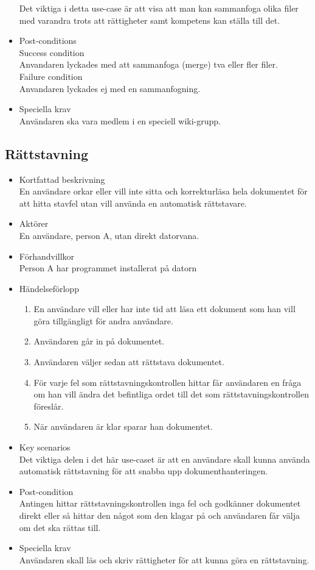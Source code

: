 \begin{itemize}
	Det viktiga i detta use-case är att visa att man kan sammanfoga olika filer med varandra trots att rättigheter samt kompetens kan ställa till det.
	\item Post-conditions	
		\\Success condition 
		\\Anvandaren lyckades med att sammanfoga (merge) tva eller fler filer.
		\\Failure condition
		\\Anvandaren lyckades ej med en sammanfogning.
		
	\item Speciella krav
	\\Användaren ska vara medlem i en speciell wiki-grupp.
\end{itemize}

\subsection{Rättstavning}
\begin{itemize}
	\item Kortfattad beskrivning
	\\En användare orkar eller vill inte sitta och korrekturläsa hela dokumentet för att hitta stavfel utan vill använda en automatisk rättstavare.
	\item Aktörer
	\\En användare, person A, utan direkt datorvana.
	\item Förhandvillkor
	\\Person A har programmet installerat på datorn
	\item Händelseförlopp
	\begin{enumerate}
		\item En användare vill eller har inte tid att läsa ett dokument som han vill göra tillgängligt för andra användare.
		\item Användaren går in på dokumentet.
		\item Användaren väljer sedan att rättstava dokumentet.
		\item För varje fel som rättstavningskontrollen hittar får användaren en fråga om han vill ändra det befintliga ordet till det som rättstavningskontrollen föreslår.
		\item När användaren är klar sparar han dokumentet.
	\end{enumerate}
	\item Key scenarios
	\\Det viktiga delen i det här use-caset är att en användare skall kunna använda automatisk rättstavning för att snabba upp dokumenthanteringen.
	\item Post-condition
	\\ Antingen hittar rättstavningskontrollen inga fel och godkänner dokumentet direkt eller så hittar den något som den klagar på och användaren får välja om det ska rättas till.
	\item Speciella krav
	\\Användaren skall läs och skriv rättigheter för att kunna göra en rättstavning.
\end{itemize}

